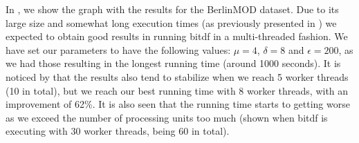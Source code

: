 {In , we show the graph with the results for the BerlinMOD dataset. Due to its large size
and somewhat long execution times (as previously presented in ) we expected to obtain good results
in running \ac{bitdf} in a multi-threaded fashion. We have set our parameters to have the following values: $\mu=4$,
$\delta=8$ and $\epsilon=200$, as we had those resulting in the longest running time (around 1000 seconds). It is
noticed by  that the results also tend to stabilize when we reach 5 worker threads (10 in
total), but we reach our best running time with 8 worker threads, with an improvement of 62\%. It is also seen that the
running time starts to getting worse as we exceed the number of processing units too much (shown when \ac{bitdf} is
executing with 30 worker threads, being 60 in total).

}
